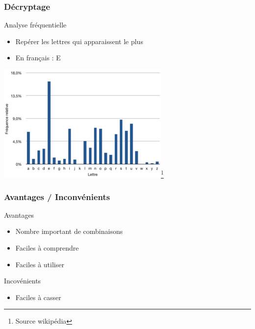 \documentclass[xcolor={dvipsnames}]{beamer}
\begin{document}

\begin{frame}
\frametitle{Décryptage}

\begin{block}{Analyse fréquentielle}
	\begin{itemize}
		\item Repérer les lettres qui apparaissent le plus
		\item En français : E
	\end{itemize}
\end{block}

\begin{center}
	\includegraphics[scale=0.6]{freq}\footnote{Source wikipédia}
\end{center}	

\end{frame}

\begin{frame}
\frametitle{Avantages / Inconvénients}

\begin{exampleblock}{Avantages}
	\begin{itemize}
		\item Nombre important de combinaisons
		\item Faciles à comprendre
		\item Faciles à utiliser
	\end{itemize}
\end{exampleblock}

\begin{alertblock}{Incovénients}
	\begin{itemize}
		\item Faciles à casser
	\end{itemize}
\end{alertblock}
\end{frame}
\end{document}
